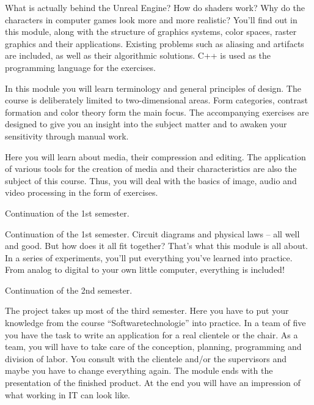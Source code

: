 \label{lec:ecg}
What is actually behind the Unreal Engine? How do shaders work?
Why do the characters in computer games look more and more realistic?
You'll find out in this module, along with the structure of graphics systems, color spaces, raster graphics and their applications.
Existing problems such as aliasing and artifacts are included, as well as their algorithmic solutions.
C++ is used as the programming language for the exercises.

In this module you will learn terminology and general principles of design.
The course is deliberately limited to two-dimensional areas.
Form categories, contrast formation and color theory form the main focus.
The accompanying exercises are designed to give you an insight into the subject matter and to awaken your sensitivity through manual work.

Here you will learn about media, their compression and editing.
The application of various tools for the creation of media and their characteristics are also the subject of this course.
Thus, you will deal with the basics of image, audio and video processing in the form of exercises.

Continuation of the 1st semester.

Continuation of the 1st semester. Circuit diagrams and physical laws -- all well and good. But how does it all fit together?
That's what this module is all about. In a series of experiments, you'll put everything you've learned into practice.
From analog to digital to your own little computer, everything is included!

\newpage


Continuation of the 2nd semester.

The project takes up most of the third semester.
Here you have to put your knowledge from the course \enquote{Softwaretechnologie} into practice.
In a team of five you have the task to write an application for a real clientele or the chair.
As a team, you will have to take care of the conception, planning, programming and division of labor.
You consult with the clientele and/or the supervisors and maybe you have to change everything again.
The module ends with the presentation of the finished product.
At the end you will have an impression of what working in IT can look like.

